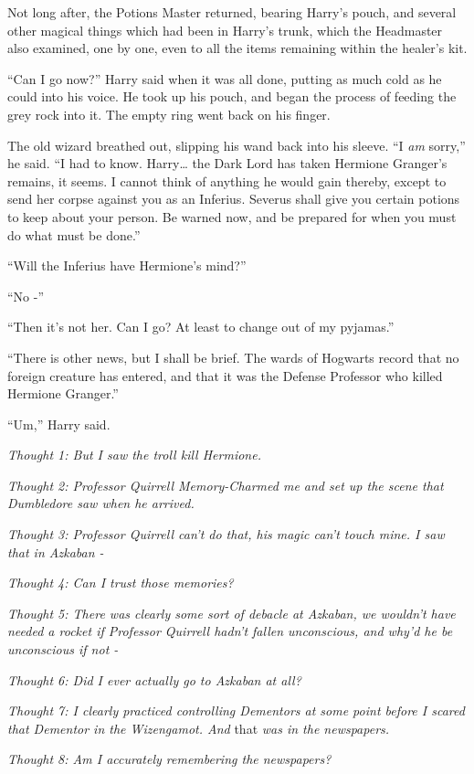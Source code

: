 Not long after, the Potions Master returned, bearing Harry's pouch, and
several other magical things which had been in Harry's trunk, which the
Headmaster also examined, one by one, even to all the items remaining
within the healer's kit.

``Can I go now?'' Harry said when it was all done, putting as much cold
as he could into his voice. He took up his pouch, and began the process
of feeding the grey rock into it. The empty ring went back on his
finger.

The old wizard breathed out, slipping his wand back into his sleeve. ``I
\emph{am} sorry,'' he said. ``I had to know. Harry\ldots{} the Dark Lord
has taken Hermione Granger's remains, it seems. I cannot think of
anything he would gain thereby, except to send her corpse against you as
an Inferius. Severus shall give you certain potions to keep about your
person. Be warned now, and be prepared for when you must do what must be
done.''

``Will the Inferius have Hermione's mind?''

``No -''

``Then it's not her. Can I go? At least to change out of my pyjamas.''

``There is other news, but I shall be brief. The wards of Hogwarts
record that no foreign creature has entered, and that it was the Defense
Professor who killed Hermione Granger.''

``Um,'' Harry said.

\emph{Thought 1: But I saw the troll kill Hermione.}

\emph{Thought 2: Professor Quirrell Memory-Charmed me and set up the
scene that Dumbledore saw when he arrived.}

\emph{Thought 3: Professor Quirrell can't do that, his magic can't touch
mine. I saw that in Azkaban -}

\emph{Thought 4: Can I trust those memories?}

\emph{Thought 5: There was clearly some sort of debacle at Azkaban, we
wouldn't have needed a rocket if Professor Quirrell hadn't fallen
unconscious, and why'd he be unconscious if not -}

\emph{Thought 6: Did I ever actually go to Azkaban at all?}

\emph{Thought 7: I clearly practiced controlling Dementors at some point
before I scared that Dementor in the Wizengamot. And} that \emph{was in
the newspapers.}

\emph{Thought 8: Am I accurately remembering the newspapers?}


